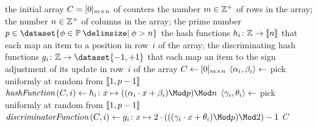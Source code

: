 \begin{algorithmic}[1]
  \Out the initial array \( C = \lbrack0\rbrack_{m \times n} \) of counters
  \Constant the number \( m \in \mathbb{Z}^{+} \) of rows in the array; the number \( n \in \mathbb{Z}^{+} \) of columns in the array; the prime number \( p \in \dataset{\phi \in \primes \suchthat \phi > n} \)
  \Local the hash functions \( h_{i} \colon \mathbb{Z} \to \llbracket n\rrbracket \) that each map an item to a position in row~\( i \) of the array; the discriminating hash functions \( g_{i} \colon \integers \to \dataset{-1, +1} \) that each map an item to the sign adjustment of its update in row~\( i \) of the array
    \State \( C \gets \lbrack0\rbrack_{m \times n} \)
      \State \( \langle\alpha_{i}, \beta_{i}\rangle \gets \) pick uniformly at random from \( \llbracket1, p - 1\rrbracket \)
      \State \( \hashFunction (C, i) \gets h_{i} \colon x \mapsto ((\alpha_{i} \cdot x + \beta_{i}) \Mod p) \Mod n \)
      \State \( \langle\gamma_{i}, \theta_{i}\rangle \gets \) pick uniformly at random from \( \llbracket1, p - 1\rrbracket \)
      \State \( \discriminatorFunction (C, i) \gets g_{i} \colon x \mapsto 2 \cdot (((\gamma_{i} \cdot x + \theta_{i}) \Mod p) \Mod 2) - 1 \)
    \EndFor
    \State \Return \( C \)
  \EndFunction
\end{algorithmic}
